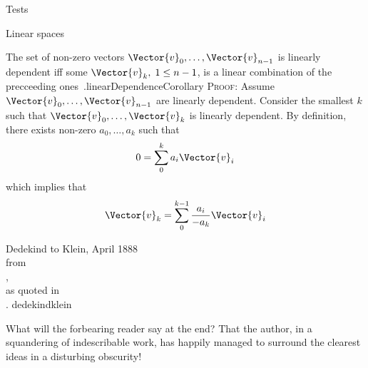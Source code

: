 \documentclass{PalisadesLakesBook}
\begin{document}
\begin{plSection}{Tests}
\begin{plSection}{Linear spaces}
\begin{plCorollary}{The set of non-zero vectors
 $\Vector{v}_0, \ldots ,\Vector{v}_{n-1}$
is linearly dependent iff some $\Vector{v}_k, \; 1 \leq n-1$, 
is a linear combination of the precceeding 
ones~\cite[Section 6]{Halmos:1958:Finite}.}{linearDependenceCorollary}
\textsc{Proof:}
Assume  $\Vector{v}_0, \ldots ,\Vector{v}_{n-1}$ are linearly dependent.
Consider the smallest $k$ such that 
$\Vector{v}_0, \ldots ,\Vector{v}_{k}$ is linearly dependent.
By definition,
there exists non-zero $a_0, \ldots ,a_{k}$ such that
\begin{equation}
0 = \sum_0^k a_i \Vector{v}_i
\end{equation}
which implies that
\begin{equation}
\Vector{v}_k = \sum_0^{k-1} \frac{a_i}{- a_k} \Vector{v}_i
\end{equation}
\end{plCorollary}
\end{plSection}%
\begin{plQuote}
{Dedekind to Klein, April 1888\\ 
from\\ ,\\
as quoted in\\ .}
{dedekindklein}
{\fraklines
{}
\par
{}
\par
{}
\par
}
What will the forbearing reader say at the end? That the author, 
in a squandering of indescribable
work, has happily managed to surround the clearest ideas
 in a disturbing obscurity!
\end{plQuote}


\end{plSection}
\end{document}
